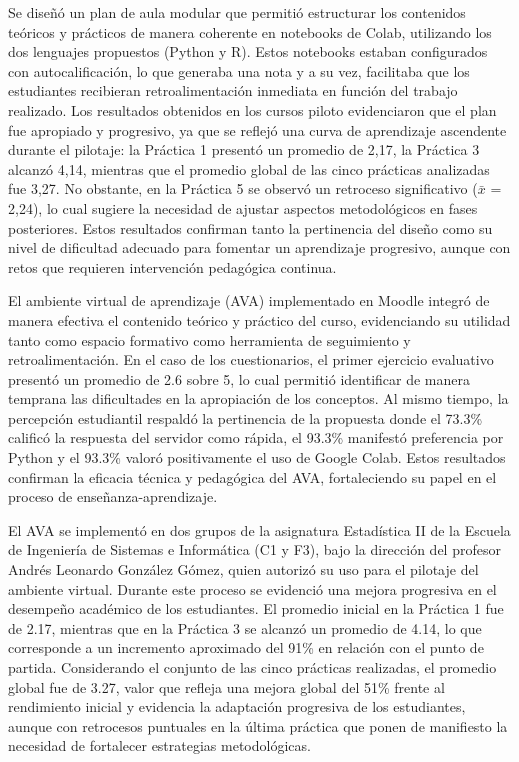 \documentclass[letter,oneside,12pt,spanish]{report}
\begin{document}
Se diseñó un plan de aula modular que permitió estructurar los contenidos teóricos y prácticos de manera coherente en notebooks de Colab, utilizando los dos lenguajes propuestos (Python y R). Estos notebooks estaban configurados con autocalificación, lo que generaba una nota y a su vez, facilitaba que los estudiantes recibieran retroalimentación inmediata en función del trabajo realizado. Los resultados obtenidos en los cursos piloto evidenciaron que el plan fue apropiado y progresivo, ya que se reflejó una curva de aprendizaje ascendente durante el pilotaje: la Práctica 1 presentó un promedio de 2,17, la Práctica 3 alcanzó 4,14, mientras que el promedio global de las cinco prácticas analizadas fue 3,27. No obstante, en la Práctica 5 se observó un retroceso significativo ($\bar{x}$ = 2,24), lo cual sugiere la necesidad de ajustar aspectos metodológicos en fases posteriores. Estos resultados confirman tanto la pertinencia del diseño como su nivel de dificultad adecuado para fomentar un aprendizaje progresivo, aunque con retos que requieren intervención pedagógica continua.

El ambiente virtual de aprendizaje (AVA) implementado en Moodle integró de manera efectiva el contenido teórico y práctico del curso, evidenciando su utilidad tanto como espacio formativo como herramienta de seguimiento y retroalimentación. En el caso de los cuestionarios, el primer ejercicio evaluativo presentó un promedio de 2.6 sobre 5, lo cual permitió identificar de manera temprana las dificultades en la apropiación de los conceptos. Al mismo tiempo, la percepción estudiantil respaldó la pertinencia de la propuesta donde el 73.3\% calificó la respuesta del servidor como rápida, el 93.3\% manifestó preferencia por Python y el 93.3\% valoró positivamente el uso de Google Colab. Estos resultados confirman la eficacia técnica y pedagógica del AVA, fortaleciendo su papel en el proceso de enseñanza-aprendizaje.

El AVA se implementó en dos grupos de la asignatura Estadística II de la Escuela de Ingeniería de Sistemas e Informática (C1 y F3), bajo la dirección del profesor Andrés Leonardo González Gómez, quien autorizó su uso para el pilotaje del ambiente virtual. Durante este proceso se evidenció una mejora progresiva en el desempeño académico de los estudiantes. El promedio inicial en la Práctica 1 fue de 2.17, mientras que en la Práctica 3 se alcanzó un promedio de 4.14, lo que corresponde a un incremento aproximado del 91\% en relación con el punto de partida. Considerando el conjunto de las cinco prácticas realizadas, el promedio global fue de 3.27, valor que refleja una mejora global del 51\% frente al rendimiento inicial y evidencia la adaptación progresiva de los estudiantes, aunque con retrocesos puntuales en la última práctica que ponen de manifiesto la necesidad de fortalecer estrategias metodológicas.
\end{document}
